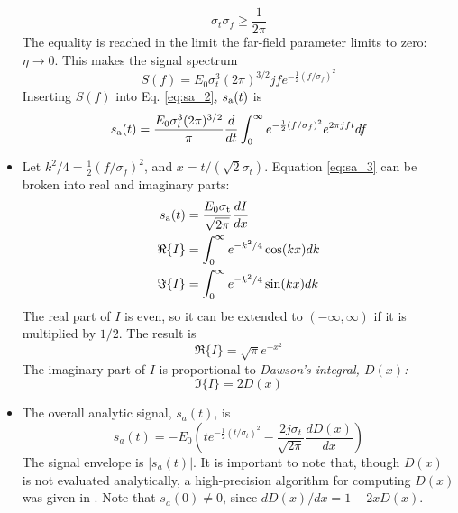 \documentclass[amsmath,amssymb,aps,prd,10pt,twocolumn,showkeys]{revtex4}
\begin{document}
\begin{itemize}
\begin{equation}
\sigma_t \sigma_f \geq \frac{1}{2\pi}
\end{equation}
The equality is reached in the limit the far-field parameter limits to zero: $\eta \to 0$.  This makes the signal spectrum
\begin{equation}
S(f) = E_0 \sigma_t^3 (2\pi)^{3/2} j f e^{-\frac{1}{2}\left(f/\sigma_f\right)^2} \label{eq:spec}
\end{equation}
Inserting $S(f)$ into Eq. \ref{eq:sa_2}, $s_{\rm a}(t)$ is
\begin{equation}
s_{\rm a}(t) = \frac{E_0 \sigma_t^3 (2\pi)^{3/2}}{\pi} \frac{d}{dt}\int_0^{\infty} e^{-\frac{1}{2}\left(f/\sigma_f\right)^2} e^{2\pi j f t} df \label{eq:sa_3}
\end{equation}
\item Let $k^2/4 = \frac{1}{2}\left(f/\sigma_f\right)^2$, and $x = t/(\sqrt{2}\sigma_t)$.  Equation \ref{eq:sa_3} can be broken into real and imaginary parts:
\begin{align}
s_{\rm a}(t) &= \frac{E_0 \sigma_{\rm t}}{\sqrt{2\pi}}\frac{dI}{dx} \\
\Re\lbrace I \rbrace &= \int_0^{\infty} e^{-k^2/4}\cos(kx) dk \\
\Im\lbrace I \rbrace &= \int_0^{\infty} e^{-k^2/4}\sin(kx) dk
\end{align}
The real part of $I$ is even, so it can be extended to $(-\infty,\infty)$ if it is multiplied by $1/2$.  The result is
\begin{equation}
\Re\lbrace I \rbrace = \sqrt{\pi} e^{-x^2}
\end{equation}
The imaginary part of $I$ is proportional to \textit{Dawson's integral, $D(x)$:}
\begin{equation}
\Im\lbrace I\rbrace = 2 D(x)
\end{equation}
\item The overall analytic signal, $s_a(t)$, is
\begin{equation}
s_a(t) = -E_0 \left(t e^{-\frac{1}{2}\left(t/\sigma_t\right)^2} - \frac{2 j\sigma_t}{\sqrt{2\pi}} \frac{dD(x)}{dx}\right) \label{eq:sa_4}
\end{equation}
The signal envelope is $|s_a(t)|$.  It is important to note that, though $D(x)$ is not evaluated analytically, a high-precision algorithm for computing $D(x)$ was given in \cite{10.1063/1.4822832}.  Note that $s_a(0) \neq 0$, since $dD(x)/dx = 1 - 2x D(x)$.

\end{itemize}
\end{document}

